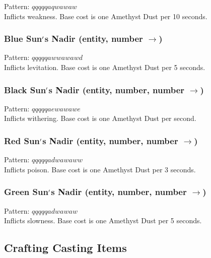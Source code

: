 \documentclass[12pt]{article}
\begin{document}
    Pattern: $qqqqqaqwawaw$\\
      Inflicts weakness. Base cost is one Amethyst Dust per 10 seconds.\\


  \label{sec: patterns/spells/nadirs@hexcasting:potion/levitation}
\subsubsection*{Blue Sun$\rq$s Nadir (entity, number $\rightarrow$)}

    Pattern: $qqqqqawwawawd$\\
      Inflicts levitation. Base cost is one Amethyst Dust per 5 seconds.\\


  \label{sec: patterns/spells/nadirs@hexcasting:potion/wither}
\subsubsection*{Black Sun$\rq$s Nadir (entity, number, number $\rightarrow$)}

    Pattern: $qqqqqaewawawe$\\
      Inflicts withering. Base cost is one Amethyst Dust per second.\\


  \label{sec: patterns/spells/nadirs@hexcasting:potion/poison}
\subsubsection*{Red Sun$\rq$s Nadir (entity, number, number $\rightarrow$)}

    Pattern: $qqqqqadwawaww$\\
      Inflicts poison. Base cost is one Amethyst Dust per 3 seconds.\\


  \label{sec: patterns/spells/nadirs@hexcasting:potion/slowness}
\subsubsection*{Green Sun$\rq$s Nadir (entity, number, number $\rightarrow$)}

    Pattern: $qqqqqadwawaw$\\
      Inflicts slowness. Base cost is one Amethyst Dust per 5 seconds.\\

\newpage

\label{sec:patterns/spells/hexcasting}
\subsection*{Crafting Casting Items}
\end{document}
